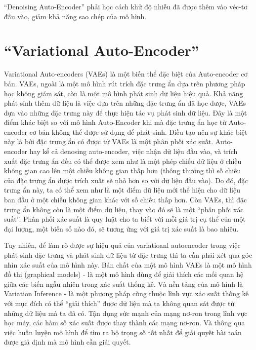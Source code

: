     ``Denoising Auto-Encoder'' phải học cách khử độ nhiễu đã được thêm vào véc-tơ đầu vào,
    giảm khả năng sao chép của mô hình.






\section{``Variational Auto-Encoder''} \label{chap2/sec2}
        Variational Auto-encoders (VAEs) là một biến thể đặc biệt của Auto-encoder cơ bản. VAEs, ngoài là một mô hình rút trích đặc trưng ẩn dựa trên phương pháp học không giám sát, còn là một mô hình phát sinh dữ liệu hiệu quả. Khả năng phát sinh thêm dữ liệu là việc dựa trên những đặc trưng ẩn đã học được, VAEs dựa vào những đặc trưng này để thực hiện tác vụ phát sinh dữ liệu. Đây là một điểm khác biệt so với mô hình Auto-Encoder khi mà đặc trưng ẩn học từ Auto-encoder cơ bản không thể được sử dụng để phát sinh. Điều tạo nên sự khác biệt này là bởi đặc trưng ẩn có được từ VAEs là một phân phối xác suất. Auto-encoder hay kể cả denosing auto-encoder, việc nhận dữ liệu đầu vào, và trích xuất đặc trưng ẩn đều có thể được xem như là một phép chiếu dữ liệu ở chiều không gian cao lên một chiều không gian thấp hơn (thông thường thì số chiều của đặc trưng ẩn dược trích xuất sẽ nhỏ hơn so với dữ liệu đầu vào). Do đó, đặc trưng ẩn này, ta có thể xem như là một điểm dữ liệu mới thể hiện cho dữ liệu ban đầu ở một chiều không gian khác với số chiều thấp hơn. Còn VAEs, thì đặc trưng ẩn không còn là một điểm dữ liệu, thay vào đó sẽ là một ``phân phối xác suất''. Phân phối xác suất là quy luật cho ta biết với mỗi giá trị cụ thể của một đại lượng, một biến số nào đó, sẽ tương ứng với giá trị xác suất là bao nhiêu. 

        Tuy nhiên, để làm rõ được sự hiệu quả của variatioanl autoencoder trong việc phát sinh đặc trưng và phát sinh dữ liệu từ đặc trưng thì ta cần phải xét qua góc nhìn xác suất của mô hình này.
        Bản chất của một mô hình VAEs là một mô hình đồ thị (graphical models) - là một mô hình dùng để giải thích các mối quan hệ giữa các biến ngẫu nhiên trong xác suất thống kê. Và nền tảng của mô hình là Variation Inference - là một phương pháp cũng thuộc lĩnh vực xác suất thống kê với mục đích có thể ``giải thích'' được dữ liệu mà ta không quan sát được từ những dữ liệu mà ta đã có. Tận dụng sức mạnh của mạng nơ-ron trong lĩnh vực học máy, các hàm số xác suất được thay thành các mạng nơ-ron. Và thông qua việc huấn luyện mô hình để tìm ra bộ trọng số tốt nhất để giải quyết bài toán được giả định mà mô hình cần giải quyết. 

